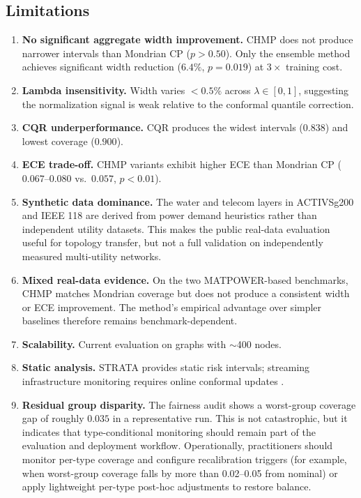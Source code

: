 \documentclass[twoside,11pt]{article}
\begin{document}
\subsection{Limitations}

\begin{enumerate}
\item \textbf{No significant aggregate width improvement.} CHMP does not
produce narrower intervals than Mondrian CP ($p > 0.50$). Only the ensemble
method achieves significant width reduction ($6.4\%$, $p = 0.019$) at
$3\times$ training cost.

\item \textbf{Lambda insensitivity.} Width varies $<0.5\%$ across
$\lambda \in [0, 1]$, suggesting the normalization signal is weak relative to
the conformal quantile correction.

\item \textbf{CQR underperformance.} CQR produces the widest intervals
($0.838$) and lowest coverage ($0.900$).

\item \textbf{ECE trade-off.} CHMP variants exhibit higher ECE than Mondrian
CP ($0.067$--$0.080$ vs.\ $0.057$, $p < 0.01$).

\item \textbf{Synthetic data dominance.} The water and telecom layers in
ACTIVSg200 and IEEE 118 are derived from power demand heuristics rather than
independent utility datasets. This makes the public real-data evaluation useful
for topology transfer, but not a full validation on independently measured
multi-utility networks.

\item \textbf{Mixed real-data evidence.} On the two MATPOWER-based benchmarks,
CHMP matches Mondrian coverage but does not produce a consistent width or ECE
improvement. The method's empirical advantage over simpler baselines therefore
remains benchmark-dependent.

\item \textbf{Scalability.} Current evaluation on graphs with $\sim$400 nodes.

\item \textbf{Static analysis.} STRATA provides static risk intervals;
streaming infrastructure monitoring requires online conformal updates
\citep{gibbs2021adaptive}.

\item \textbf{Residual group disparity.} The fairness audit shows a worst-group
coverage gap of roughly $0.035$ in a representative run. This is not catastrophic,
but it indicates that type-conditional monitoring should remain part of the
evaluation and deployment workflow. Operationally, practitioners should monitor
per-type coverage and configure recalibration triggers (for example, when
worst-group coverage falls by more than 0.02--0.05 from nominal) or apply
lightweight per-type post-hoc adjustments to restore balance.
\end{enumerate}
\end{document}

